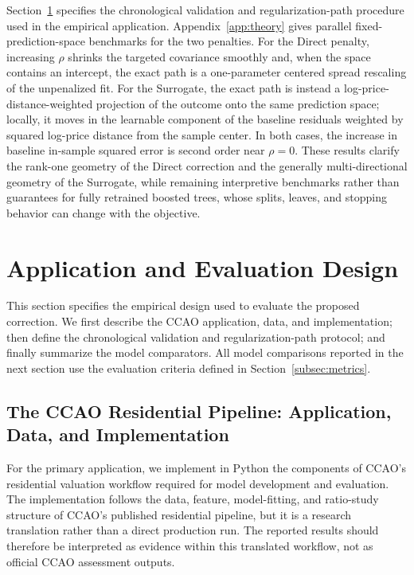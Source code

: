 \documentclass[10pt]{article}
\theoremstyle{definition}
\newcommand{\1}{\mathbf{1}}
\begin{document}
Section~\ref{sec:empirical_design} specifies the chronological validation and regularization-path procedure used in the empirical application. Appendix~\ref{app:theory} gives parallel fixed-prediction-space benchmarks for the two penalties. For the Direct penalty, increasing $\rho$ shrinks the targeted covariance smoothly and, when the space contains an intercept, the exact path is a one-parameter centered spread rescaling of the unpenalized fit. For the Surrogate, the exact path is instead a log-price-distance-weighted projection of the outcome onto the same prediction space; locally, it moves in the learnable component of the baseline residuals weighted by squared log-price distance from the sample center. In both cases, the increase in baseline in-sample squared error is second order near $\rho=0$. These results clarify the rank-one geometry of the Direct correction and the generally multi-directional geometry of the Surrogate, while remaining interpretive benchmarks rather than guarantees for fully retrained boosted trees, whose splits, leaves, and stopping behavior can change with the objective.


\section{Application and Evaluation Design}
\label{sec:empirical_design}

{This section specifies the empirical design used to evaluate the proposed correction. We first describe the CCAO application, data, and implementation; then define the chronological validation and regularization-path protocol; and finally summarize the model comparators. All model comparisons reported in the next section use the evaluation criteria defined in Section~\ref{subsec:metrics}.}


\subsection{{The CCAO Residential Pipeline: Application, Data, and Implementation}}
\label{subsec:ccao_design}


{For the primary application, we implement in Python the components of CCAO's residential valuation workflow required for model development and evaluation. The implementation follows the data, feature, model-fitting, and ratio-study structure of CCAO's published residential pipeline, but it is a research translation rather than a direct production run. The reported results should therefore be interpreted as evidence within this translated workflow, not as official CCAO assessment outputs.}
\end{document}

